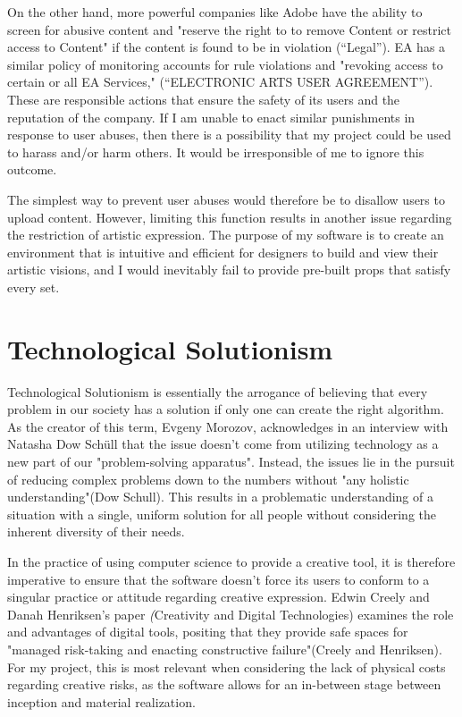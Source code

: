 \documentclass[10pt,twocolumn]{article}
\begin{document}
On the other hand, more powerful companies like Adobe have the ability to screen for abusive content and "reserve the right to to remove Content or restrict access to Content" if the content is found to be in violation (“Legal”). EA has a similar policy of monitoring accounts for rule violations and "revoking access to certain or all EA Services," (“ELECTRONIC ARTS USER AGREEMENT”). These are responsible actions that ensure the safety of its users and the reputation of the company. If I am unable to enact similar punishments in response to user abuses, then there is a possibility that my project could be used to harass and/or harm others. It would be irresponsible of me to ignore this outcome.

The simplest way to prevent user abuses would therefore be to disallow users to upload content. However, limiting this function results in another issue regarding the restriction of artistic expression. The purpose of my software is to create an environment that is intuitive and efficient for designers to build and view their artistic visions, and I would inevitably fail to provide pre-built props that satisfy every set. 
\section{Technological Solutionism}
Technological Solutionism is essentially the arrogance of believing that every problem in our society has a solution if only one can create the right algorithm. As the creator of this term, Evgeny Morozov, acknowledges in an interview with Natasha Dow Schüll that the issue doesn't come from utilizing technology as a new part of our "problem-solving apparatus". Instead, the issues lie in the pursuit of reducing complex problems down to the numbers without "any holistic understanding"(Dow Schull). This results in a problematic understanding of a situation with a single, uniform solution for all people without considering the inherent diversity of their needs.

In the practice of using computer science to provide a creative tool, it is therefore imperative to ensure that the software doesn't force its users to conform to a singular practice or attitude regarding creative expression. Edwin Creely and Danah Henriksen's paper \textit(Creativity and Digital Technologies) examines the role and advantages of digital tools, positing that they provide safe spaces for "managed risk-taking and enacting constructive failure"(Creely and Henriksen). For my project, this is most relevant when considering the lack of physical costs regarding creative risks, as the software allows for an in-between stage between inception and material realization. 
\end{document}
